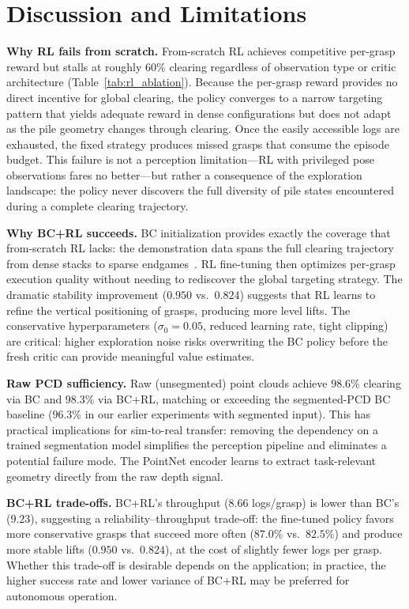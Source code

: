 \documentclass[conference]{IEEEtran}
\begin{document}
\section{Discussion and Limitations}

\textbf{Why RL fails from scratch.}
From-scratch RL achieves competitive per-grasp reward but stalls at roughly 60\% clearing regardless of observation type or critic architecture (Table~\ref{tab:rl_ablation}).
Because the per-grasp reward provides no direct incentive for global clearing, the policy converges to a narrow targeting pattern that yields adequate reward in dense configurations but does not adapt as the pile geometry changes through clearing.
Once the easily accessible logs are exhausted, the fixed strategy produces missed grasps that consume the episode budget.
This failure is not a perception limitation---RL with privileged pose observations fares no better---but rather a consequence of the exploration landscape: the policy never discovers the full diversity of pile states encountered during a complete clearing trajectory.

\textbf{Why BC+RL succeeds.}
BC initialization provides exactly the coverage that from-scratch RL lacks: the demonstration data spans the full clearing trajectory from dense stacks to sparse endgames~\cite{rajeswaran2018learning}.
RL fine-tuning then optimizes per-grasp execution quality without needing to rediscover the global targeting strategy.
The dramatic stability improvement ($0.950$ vs.\ $0.824$) suggests that RL learns to refine the vertical positioning of grasps, producing more level lifts.
The conservative hyperparameters ($\sigma_0 = 0.05$, reduced learning rate, tight clipping) are critical: higher exploration noise risks overwriting the BC policy before the fresh critic can provide meaningful value estimates.

\textbf{Raw PCD sufficiency.}
Raw (unsegmented) point clouds achieve $98.6$\% clearing via BC and $98.3$\% via BC+RL, matching or exceeding the segmented-PCD BC baseline ($96.3$\% in our earlier experiments with segmented input).
This has practical implications for sim-to-real transfer: removing the dependency on a trained segmentation model simplifies the perception pipeline and eliminates a potential failure mode.
The PointNet encoder learns to extract task-relevant geometry directly from the raw depth signal.

\textbf{BC+RL trade-offs.}
BC+RL's throughput ($8.66$ logs/grasp) is lower than BC's ($9.23$), suggesting a reliability--throughput trade-off: the fine-tuned policy favors more conservative grasps that succeed more often ($87.0$\% vs.\ $82.5$\%) and produce more stable lifts ($0.950$ vs.\ $0.824$), at the cost of slightly fewer logs per grasp.
Whether this trade-off is desirable depends on the application; in practice, the higher success rate and lower variance of BC+RL may be preferred for autonomous operation.
\end{document}
